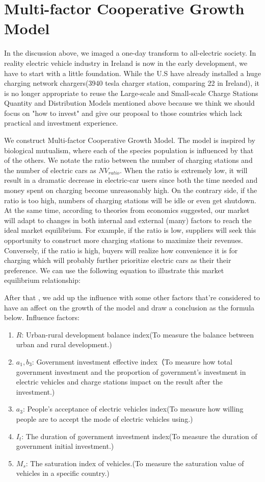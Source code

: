 \documentclass{mcmthesis}
\begin{document}
\section{Multi-factor Cooperative Growth Model}

In the discussion above, we imaged a one-day transform to all-electric society. In reality electric vehicle industry in Ireland is now in the early development, we have to start with a little foundation. While the U.S have already installed a huge charging network chargers(3940 tesla charger station, comparing 22 in Ireland), it is no longer appropriate to reuse the Large-scale and Small-scale Charge Stations Quantity and Distribution Models mentioned above because we think we should focus on "how to invest" and give our proposal to those countries which lack practical and investment experience.  
\par
We construct Multi-factor Cooperative Growth Model. The model is inspired by biological mutualism, where each of the species population is influenced by that of the others. We notate the ratio between the number of charging stations and the number of electric cars as $NV_{ratio}$. When the ratio is extremely low, it will result in a dramatic decrease in electric-car users since both the time needed and money spent on charging become unreasonably high. On the contrary side, if the ratio is too high, numbers of charging stations will be idle or even get shutdown. At the same time, according to  theories from economics suggested, our market will adapt to changes in both internal and external (many) factors to reach the ideal market equilibrium. For example, if the ratio is low, suppliers will seek this opportunity to construct more charging stations to maximize their revenues. Conversely, if the ratio is high, buyers will realize how convenience it is for charging which will probably further prioritize electric cars as their their preference. We can use the following equation to illustrate this market equilibrium relationship: 
\par

After that , we add up the influence with some other factors that're considered to have an affect on the growth of the model and draw a conclusion as the formula below.
Influence factors:
\begin{enumerate}[1.]
	\item $R$: Urban-rural development balance index(To measure the balance between urban and rural development.)
	\item $a_1, b_3$: Government investment effective index（To measure how total government investment and the proportion of government's investment in electric vehicles and charge stations impact on the result after the investment.)
	\item $a_3$: People's acceptance of electric vehicles index(To measure how willing people are to accept the mode of electric vehicles using.)
	\item $I_t$: The duration of government investment index(To measure the duration of government initial investment.)
	\item $M_s$: The saturation index of vehicles.(To measure the saturation value of vehicles in a specific country.)
\end{enumerate}
\end{document}
